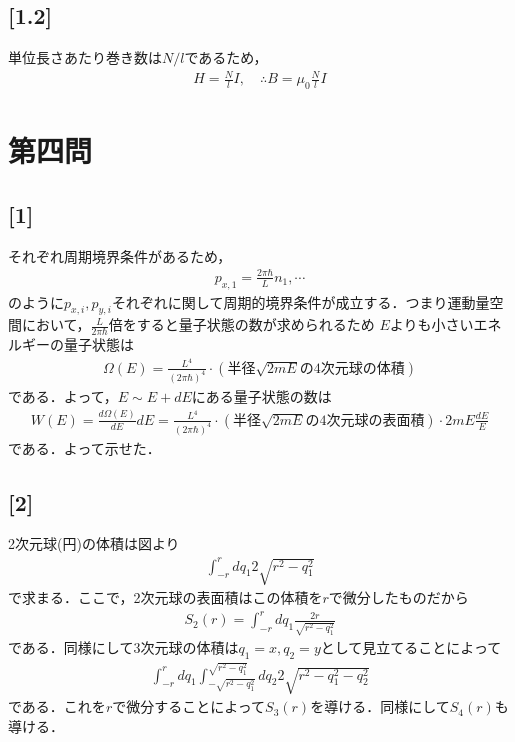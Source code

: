 \documentclass[12pt,dvipdfmx]{jsarticle}
\begin{document}
\subsection*{\large{[1.2]}}
単位長さあたり巻き数は$N/l$であるため，
\begin{eqnarray}
  H = \frac{N}{l}I,\quad\therefore B= \mu_0 \frac{N}{l}I
\end{eqnarray}

\newpage
\section*{\Large{第四問}}
\subsection*{\large{[1]}}
それぞれ周期境界条件があるため，
\begin{eqnarray}
  p_{x,1} = \frac{2\pi\hbar}{L}n_1,\cdots
\end{eqnarray}
のように$p_{x,i},p_{y,i}$それぞれに関して周期的境界条件が成立する．つまり運動量空間において，$\frac{L}{2\pi\hbar}$倍をすると量子状態の数が求められるため
$E$よりも小さいエネルギーの量子状態は
\begin{eqnarray}
  \Omega(E)=\frac{L^{4}}{(2\pi\hbar)^4}\cdot (半径\sqrt{2mE}の4次元球の体積)
\end{eqnarray}
である．よって，$E\sim E+dE$にある量子状態の数は
\begin{eqnarray}
  W(E) = \frac{d\Omega(E)}{dE}dE = \frac{L^{4}}{(2\pi\hbar)^4}\cdot (半径\sqrt{2mE}の4次元球の表面積)\cdot 2mE \frac{dE}{E}
\end{eqnarray}
である．よって示せた．
\subsection*{\large{[2]}}
2次元球(円)の体積は図より
\begin{eqnarray}
  \int_{-r}^{r} dq_1 2\sqrt{r^2-q_1^2}
\end{eqnarray}
で求まる．ここで，2次元球の表面積はこの体積を$r$で微分したものだから
\begin{eqnarray}
  S_2(r) = \int_{-r}^{r} dq_1 \frac{2r}{\sqrt{r^2-q_1^2}}
\end{eqnarray}
である．同様にして3次元球の体積は$q_1=x,q_2=y$として見立てることによって
\begin{eqnarray}
  \int_{-r}^{r}dq_1 \int_{-\sqrt{r^2-q_1^2}}^{\sqrt{r^2-q_1^2}}dq_2 2\sqrt{r^2-q_1^2-q_2^2}
\end{eqnarray}
である．これを$r$で微分することによって$S_3(r)$を導ける．同様にして$S_4(r)$も導ける．
\end{document}
